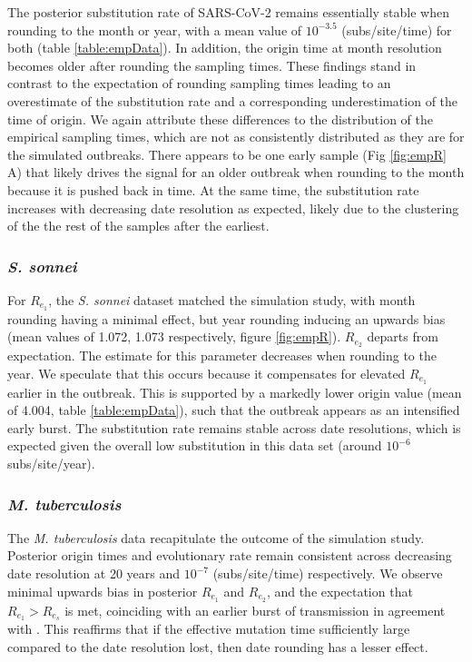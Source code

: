 \documentclass{article}
\begin{document}
\begin{spacing}{1.5}
The posterior substitution rate of SARS-CoV-2 remains essentially stable when rounding to the month or year, with a mean value of $10^{-3.5}$ (subs/site/time) for both (table \ref{table:empData}). In addition, the origin time at month resolution becomes older after rounding the sampling times. These findings stand in contrast to the expectation of rounding sampling times leading to an overestimate of the substitution rate and a corresponding underestimation of the time of origin. We again attribute these differences to the distribution of the empirical sampling times, which are not as consistently distributed as they are for the simulated outbreaks. There appears to be one early sample (Fig \ref{fig:empR} A) that likely drives the signal for an older outbreak when rounding to the month because it is pushed back in time. At the same time, the substitution rate increases with decreasing date resolution as expected, likely due to the clustering of the the rest of the samples after the earliest.

\subsubsection*{\textit{S. sonnei}}
For $R_{e_1}$, the \textit{S. sonnei} dataset matched the simulation study, with month rounding having a minimal effect, but year rounding inducing an upwards bias (mean values of 1.072, 1.073 respectively, figure \ref{fig:empR}). $R_{e_2}$ departs from expectation. The estimate for this parameter decreases when rounding to the year. We speculate that this occurs because it compensates for elevated $R_{e_1}$ earlier in the outbreak. This is supported by a markedly lower origin value (mean of 4.004, table \ref{table:empData}), such that the outbreak appears as an intensified early burst. The substitution rate remains stable across date resolutions, which is expected given the overall low substitution in this data set (around $10^{-6}$ subs/site/year).

\subsubsection*{\textit{M. tuberculosis}}
The \textit{M. tuberculosis} data recapitulate the outcome of the simulation study. Posterior origin times and evolutionary rate remain consistent across decreasing date resolution at 20 years and $10^{-7}$ (subs/site/time) respectively. We observe minimal upwards bias in posterior $R_{e_1}$ and $R_{e_2}$, and the expectation that $R_{e_1} > R_{e_s}$ is met, coinciding with an earlier burst of transmission in agreement with \citet{kuhnert_tuberculosis_2018}. This reaffirms that if the effective mutation time sufficiently large compared to the date resolution lost, then date rounding has a lesser effect.


\end{spacing}
\end{document}
